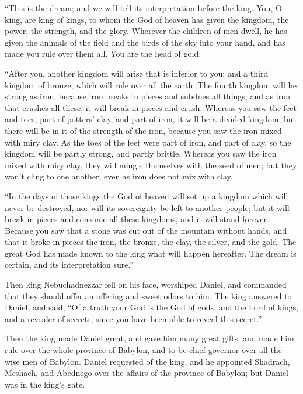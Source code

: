  ``This is the dream; and we will tell its interpretation
before the king.  You, O king, are king of kings, to whom
the God of heaven has given the kingdom, the power, the strength, and
the glory.  Wherever the children of men dwell, he has
given the animals of the field and the birds of the sky into your hand,
and has made you rule over them all. You are the head of gold.

 ``After you, another kingdom will arise that is inferior
to you; and a third kingdom of bronze, which will rule over all the
earth.  The fourth kingdom will be strong as iron,
because iron breaks in pieces and subdues all things; and as iron that
crushes all these, it will break in pieces and crush. 
Whereas you saw the feet and toes, part of potters' clay, and part of
iron, it will be a divided kingdom; but there will be in it of the
strength of the iron, because you saw the iron mixed with miry clay.
 As the toes of the feet were part of iron, and part of
clay, so the kingdom will be partly strong, and partly brittle.
 Whereas you saw the iron mixed with miry clay, they will
mingle themselves with the seed of men; but they won't cling to one
another, even as iron does not mix with clay.

 ``In the days of those kings the God of heaven will set
up a kingdom which will never be destroyed, nor will its sovereignty be
left to another people; but it will break in pieces and consume all
these kingdoms, and it will stand forever.  Because you
saw that a stone was cut out of the mountain without hands, and that it
broke in pieces the iron, the bronze, the clay, the silver, and the
gold. The great God has made known to the king what will happen
hereafter. The dream is certain, and its interpretation sure.''

 Then king Nebuchadnezzar fell on his face, worshiped
Daniel, and commanded that they should offer an offering and sweet odors
to him.  The king answered to Daniel, and said, ``Of a
truth your God is the God of gods, and the Lord of kings, and a revealer
of secrets, since you have been able to reveal this secret.''

 Then the king made Daniel great, and gave him many great
gifts, and made him rule over the whole province of Babylon, and to be
chief governor over all the wise men of Babylon.  Daniel
requested of the king, and he appointed Shadrach, Meshach, and Abednego
over the affairs of the province of Babylon; but Daniel was in the
king's gate.

